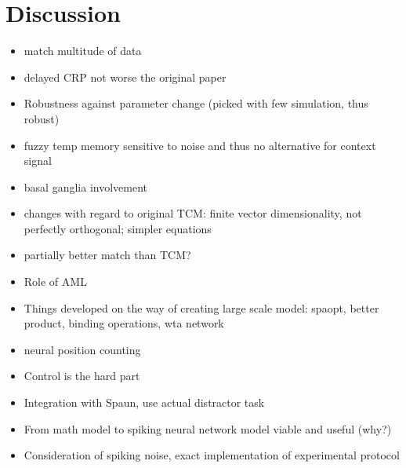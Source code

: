 \chapter{Discussion}
\begin{itemize}
    \item match multitude of data
    \item delayed CRP not worse the original paper
    \item Robustness against parameter change (picked with few simulation, thus robust)
    \item fuzzy temp memory sensitive to noise and thus no alternative for context signal
    \item basal ganglia involvement
    \item changes with regard to original TCM\@: finite vector dimensionality, not perfectly orthogonal; simpler equations
    \item partially better match than TCM\@?
    \item Role of AML
    \item Things developed on the way of creating large scale model: spaopt, better product, binding operations, wta network
    \item neural position counting
    \item Control is the hard part
    \item Integration with Spaun, use actual distractor task
    \item From math model to spiking neural network model viable and useful (why?)
    \item Consideration of spiking noise, exact implementation of experimental protocol
\end{itemize}
